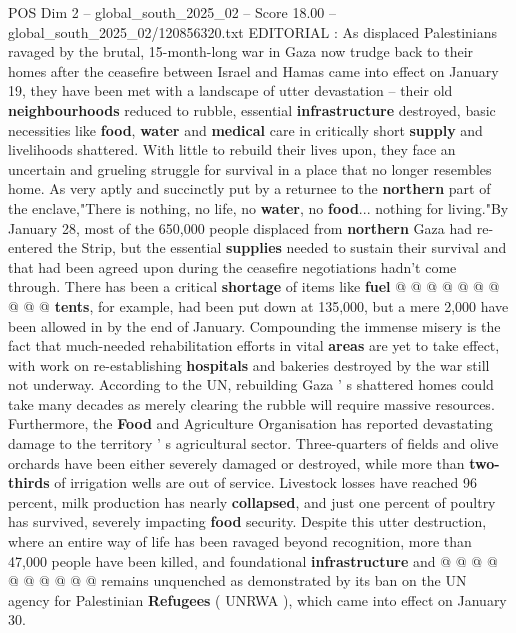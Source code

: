 \begin{textsample}{POS Dim 2 – global\_south\_2025\_02 – Score 18.00 – global\_south\_2025\_02/120856320.txt}  \label{ex:f2_pos_427}
EDITORIAL : As displaced Palestinians ravaged by the brutal, 15-month-long war in Gaza now trudge back to their homes after the ceasefire between Israel and Hamas came into effect on January 19, they have been met with a landscape of utter devastation -- their old \textbf{neighbourhoods} reduced to rubble, essential \textbf{infrastructure} destroyed, basic necessities like \textbf{food}, \textbf{water} and \textbf{medical} care in critically short \textbf{supply} and livelihoods shattered.
With little to rebuild their lives upon, they face an uncertain and grueling struggle for survival in a place that no longer resembles home.
As very aptly and succinctly put by a returnee to the \textbf{northern} part of the enclave,"There is nothing, no life, no \textbf{water}, no \textbf{food}... nothing for living."By January 28, most of the 650,000 people displaced from \textbf{northern} Gaza had re-entered the Strip, but the essential \textbf{supplies} needed to sustain their survival and that had been agreed upon during the ceasefire negotiations hadn't come through.
There has been a critical \textbf{shortage} of items like \textbf{fuel} @ @ @ @ @ @ @ @ @ @ \textbf{tents}, for example, had been put down at 135,000, but a mere 2,000 have been allowed in by the end of January.
Compounding the immense misery is the fact that much-needed rehabilitation efforts in vital \textbf{areas} are yet to take effect, with work on re-establishing \textbf{hospitals} and bakeries destroyed by the war still not underway.
According to the UN, rebuilding Gaza ' s shattered homes could take many decades as merely clearing the rubble will require massive resources.
Furthermore, the \textbf{Food} and Agriculture Organisation has reported devastating damage to the territory ' s agricultural sector.
Three-quarters of fields and olive orchards have been either severely damaged or destroyed, while more than \textbf{two-thirds} of irrigation wells are out of service.
Livestock losses have reached 96 percent, milk production has nearly \textbf{collapsed}, and just one percent of poultry has survived, severely impacting \textbf{food} security.
Despite this utter destruction, where an entire way of life has been ravaged beyond recognition, more than 47,000 people have been killed, and foundational \textbf{infrastructure} and @ @ @ @ @ @ @ @ @ @ remains unquenched as demonstrated by its ban on the UN agency for Palestinian \textbf{Refugees} ( UNRWA ), which came into effect on January 30.

\end{textsample}
